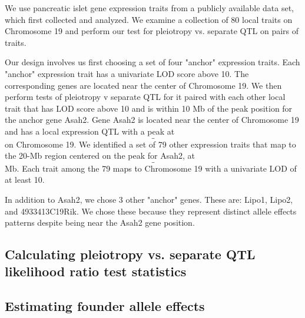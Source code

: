 \documentclass{article}
\begin{document}
We use pancreatic islet gene expression traits from a publicly available data set, which \citet{keller2018genetic} first collected and analyzed. We examine a collection of 80 local traits on Chromosome 19 and perform our test for pleiotropy vs. separate QTL on pairs of traits. 

Our design involves us first choosing a set of four "anchor" expression traits. Each "anchor" expression trait has a univariate LOD score above 10. The corresponding genes are located near the center of Chromosome 19. We then perform tests of pleiotropy v separate QTL for it paired with each other local trait that has LOD score above 10 and is within 10 Mb of the peak position for the anchor gene Asah2.
Gene Asah2 is located near the center of Chromosome 19 and has a local expression QTL with a peak at $$\_$$  on Chromosome 19. We identified a set of 79 other expression traits that map to the 20-Mb region centered on the peak for Asah2, at $$\_$$ Mb. Each trait among the 79 maps to Chromosome 19 with a univariate LOD of at least 10. 


In addition to Asah2, we chose 3 other "anchor" genes. These are: Lipo1, Lipo2, and 4933413C19Rik. We chose these because they represent distinct allele effects patterns despite being near the Asah2 gene position.





\subsection{Calculating pleiotropy vs. separate QTL likelihood ratio test statistics}



\subsection{Estimating founder allele effects}
\end{document}
